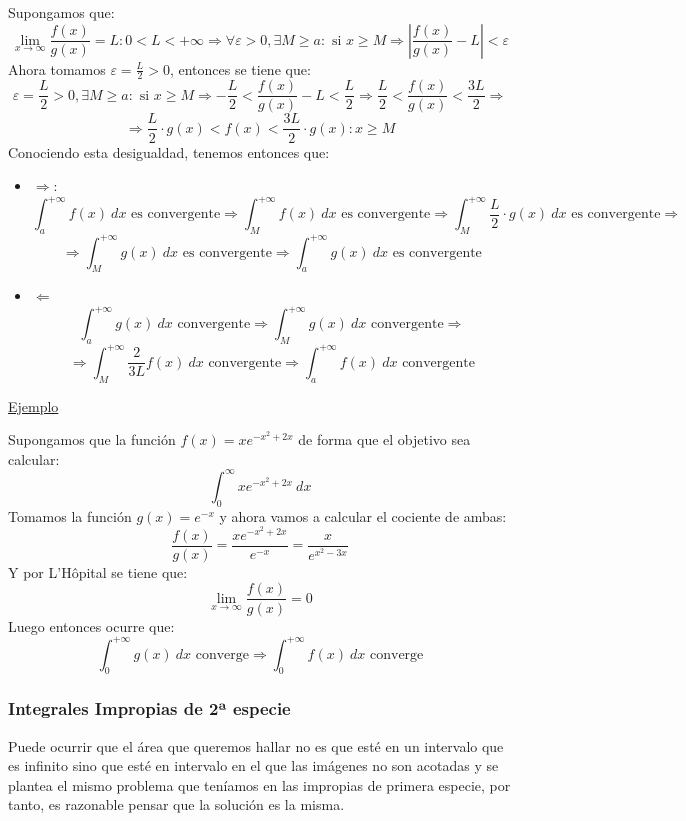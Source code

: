 \documentclass[10pt,a4paper,openright]{book}
\begin{document}
Supongamos que:
$$\lim_{x \to \infty} \frac{f(x)}{g(x)} = L : 0 < L < +\infty\Rightarrow \forall \varepsilon > 0, \exists M \geq a: \mbox{ si } x \geq M \Rightarrow \left| \frac{f(x)}{g(x)} - L\right| < \varepsilon$$
Ahora tomamos $\varepsilon = \frac{L}{2} > 0$, entonces se tiene que:
$$ \varepsilon = \frac{L}{2}> 0, \exists M \geq a: \mbox{ si } x \geq M \Rightarrow -\frac{L}{2} < \frac{f(x)}{g(x)} - L < \frac{L}{2} \Rightarrow \frac{L}{2} < \frac{f(x)}{g(x)} < \frac{3L}{2}\Rightarrow$$
$$\Rightarrow \frac{L}{2} \cdot g(x) < f(x) <  \frac{3L}{2} \cdot g(x) : x\geq M$$
Conociendo esta desigualdad, tenemos entonces que:
\begin{itemize}
\item $\Rightarrow $:
$$\int_{a}^{+\infty} f(x)\ dx\mbox{ es convergente}\Rightarrow \int_{M}^{+\infty} f(x)\ dx\mbox{ es convergente}\Rightarrow \int_{M}^{+\infty} \frac{L}{2} \cdot g(x)\ dx\mbox{ es convergente}\Rightarrow$$
$$\Rightarrow \int_{M}^{+\infty} g(x)\ dx \mbox{ es convergente}\Rightarrow \int_{a}^{+\infty} g(x)\ dx\mbox{ es convergente}$$
\item $\Leftarrow$
$$\int_{a}^{+\infty} g(x)\ dx \mbox{ convergente}\Rightarrow \int_{M}^{+\infty} g(x)\ dx \mbox{ convergente}\Rightarrow$$
$$\Rightarrow \int_{M}^{+\infty} \frac{2}{3L} f(x)\ dx \mbox{ convergente} \Rightarrow \int_{a}^{+\infty} f(x)\ dx \mbox{ convergente}$$
\end{itemize}


\underline{Ejemplo}

Supongamos que la función $f(x) = xe^{-x^2+2x}$ de forma que el objetivo sea calcular:
$$\int_{0}^{\infty} x e^{-x^2+2x} \ dx$$
Tomamos la función $g(x) = e^{-x}$ y ahora vamos a calcular el cociente de ambas:
$$\frac{f(x)}{g(x)} = \frac{xe^{-x^2+2x}}{e^{-x}} = \frac{x}{e^{x^2-3x}}$$
Y por L'Hôpital se tiene que:
$$\lim_{x \rightarrow \infty} \frac{f(x)}{g(x)} = 0$$
Luego entonces ocurre que:
$$\int_{0}^{+\infty} g(x)\ dx\mbox{ converge}\Rightarrow \int_{0}^{+\infty} f(x)\ dx\mbox{ converge}$$

\subsubsection*{Integrales Impropias de 2ª especie}
Puede ocurrir que el área que queremos hallar no es que esté en un intervalo que es infinito sino que esté en intervalo en el que las imágenes no son acotadas y se plantea el mismo problema que teníamos en las impropias de primera especie, por tanto, es razonable pensar que la solución es la misma.
\end{document}
